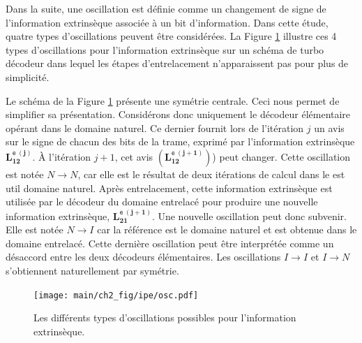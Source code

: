 

Dans la suite, une oscillation est définie comme un changement de signe de l'information extrinsèque associée à un bit
d'information. Dans cette étude, quatre types d'oscillations peuvent être considérées. La Figure 
\ref{fig:osc} illustre ces 4 types d’oscillations pour l'information extrinsèque sur un schéma de turbo décodeur dans 
lequel les étapes d'entrelacement n’apparaissent pas pour plus de simplicité.

Le schéma de la Figure \ref{fig:osc} présente une symétrie centrale. Ceci nous permet de simplifier
sa présentation. Considérons donc uniquement le décodeur élémentaire opérant dans le domaine naturel. Ce dernier 
fournit lors de l'itération $j$ un avis sur le signe de chacun des bits de la trame, exprimé par l'information extrinsèque $\mathbf{L_{12}^{\texttt{e}\ (j)}}$. À l'itération $j+1$, cet avis $\left(\mathbf{L_{12}^{\texttt{e}\ (j+1)}}\right)$) peut
changer. Cette oscillation est notée $N\rightarrow N$, car elle est le résultat de deux itérations de calcul dans le est util
domaine naturel. Après entrelacement, cette information extrinsèque est utilisée par le décodeur du domaine entrelacé 
pour produire une nouvelle information extrinsèque, $\mathbf{L_{21}^{\texttt{e}\ (j+1)}}$. Une nouvelle oscillation peut donc subvenir. Elle est notée $N\rightarrow I$
car la référence est le domaine naturel et est obtenue dans le domaine entrelacé. Cette dernière oscillation peut être 
interprétée comme un désaccord entre les deux décodeurs élémentaires. Les oscillations $I\rightarrow I$ et $I\rightarrow N$
s'obtiennent naturellement par symétrie.

\begin{figure}[tb]
	\centering
	\texttt{[image: main/ch2\_fig/ipe/osc.pdf]}
	\caption{\label{fig:osc}Les différents types d'oscillations possibles pour l'information extrinsèque.}
\end{figure}

